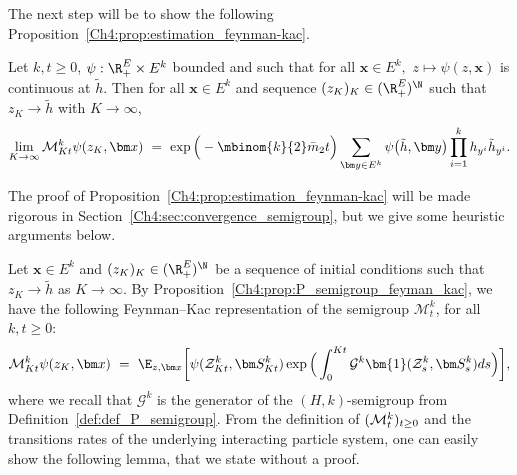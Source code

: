 \begin{refsegment}


The next step will be to show the following Proposition~\ref{Ch4:prop:estimation_feynman-kac}.


\begin{prop}\label{Ch4:prop:estimation_feynman-kac}
Let $k,t\geq 0$, $\psi:\R_+^{E}\times E^k$ bounded and such that for all $\bm x\in E^k,$ $z\mapsto \psi(z,\bm x)$ is continuous at $\tilde h$. Then for all $\bm x\in E^k$ and sequence $(z_K)_K\in(\R_+^E)^{\N}$ such that $z_K\to \tilde h$ with $K\to\infty$, 
\begin{equation*}
\lim_{K\to\infty}\mathcal{M}^k_{Kt}\psi( z_K,  \bm x)\ =\ \exp\Big(- \mbinom{k}{2} \bar m_2 t\Big) \sum_{\bm y\in E^k}\psi\big(\tilde h, \bm y \big)\prod_{i=1}^k h_{y^i}\tilde h_{y^{i}}.
\end{equation*}
\end{prop}


The proof of Proposition~\ref{Ch4:prop:estimation_feynman-kac} will be made rigorous in Section~\ref{Ch4:sec:convergence_semigroup}, but we give some heuristic arguments below.

 Let $\bm x\in E^k$ and $(z_K)_K\in (\R_+^E)^{\N}$ be a sequence of initial conditions such that $z_K\to \tilde h$ as $K\to\infty$. By Proposition~\ref{Ch4:prop:P_semigroup_feyman_kac}, we have the following Feynman--Kac representation of the semigroup $\mathcal{M}^k_t$, for all $k,t\geq 0$:
\begin{equation}
\mathcal{M}^k_{Kt}\psi( z_K,  \bm x)\ =\ \E_{z, \bm x}\bigg[\psi(\mathcal{Z}^k_{Kt}, \bm S^k_{Kt})\exp\Big(\int_0^{Kt}\mathcal{G}^k\bm{1}(\mathcal{Z}^k_{s}, \bm S^k_s)ds\Big)\bigg], \label{Ch4:eq:semi-group2}
\end{equation}
where we recall that $\mathcal{G}^k$ is the generator of the $(H,k)$-semigroup from Definition~\ref{def:def_P_semigroup}.
From the definition of $({\cal M}^{k}_t)_{t\geq0}$ and the 
transitions rates of the underlying interacting particle system, one can easily show the following lemma, that we state without a proof.


\end{refsegment}
